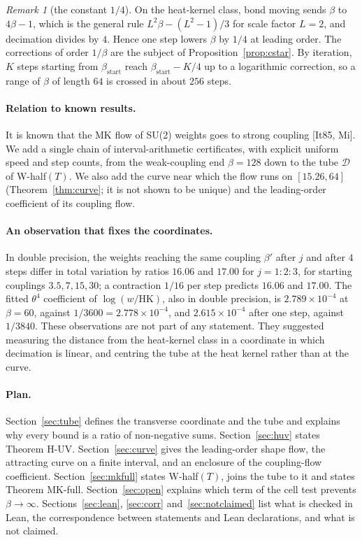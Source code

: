 \documentclass[11pt,a4paper]{article}
\theoremstyle{definition}
\theoremstyle{remark}
\newtheorem{remark}[theorem]{Remark}
\newcommand{\HK}{\mathrm{HK}}
\newcommand{\cD}{\mathcal{D}}
\begin{document}
\begin{remark}[the constant $1/4$]
On the heat-kernel class, bond moving sends $\beta$ to $4\beta-1$, which is the general rule $L^2\beta-(L^2-1)/3$ for scale factor $L=2$, and decimation divides by $4$.
Hence one step lowers $\beta$ by $1/4$ at leading order.
The corrections of order $1/\beta$ are the subject of Proposition~\ref{prop:cstar}.
By iteration, $K$ steps starting from $\beta_{\mathrm{start}}$ reach $\beta_{\mathrm{start}}-K/4$ up to a logarithmic correction, so a range of $\beta$ of length $64$ is crossed in about $256$ steps.
\end{remark}

\paragraph{Relation to known results.}
It is known that the MK flow of SU(2) weights goes to strong coupling [It85, Mi].
We add a single chain of interval-arithmetic certificates, with explicit uniform speed and step counts, from the weak-coupling end $\beta=128$ down to the tube $\cD$ of W-half$(T)$.
We also add the curve near which the flow runs on $[15.26,64]$ (Theorem~\ref{thm:curve}; it is not shown to be unique) and the leading-order coefficient of its coupling flow.

\paragraph{An observation that fixes the coordinates.}
In double precision, the weights reaching the same coupling $\beta'$ after $j$ and after $4$ steps differ in total variation by ratios $16.06$ and $17.00$ for $j=1{:}2{:}3$, for starting couplings $3.5,7,15,30$; a contraction $1/16$ per step predicts $16.06$ and $17.00$.
The fitted $\theta^4$ coefficient of $\log(w/\HK)$, also in double precision, is $2.789\times10^{-4}$ at $\beta=60$, against $1/3600=2.778\times10^{-4}$, and $2.615\times10^{-4}$ after one step, against $1/3840$.
These observations are not part of any statement.
They suggested measuring the distance from the heat-kernel class in a coordinate in which decimation is linear, and centring the tube at the heat kernel rather than at the curve.

\paragraph{Plan.}
Section~\ref{sec:tube} defines the transverse coordinate and the tube and explains why every bound is a ratio of non-negative sums.
Section~\ref{sec:huv} states Theorem H-UV.
Section~\ref{sec:curve} gives the leading-order shape flow, the attracting curve on a finite interval, and an enclosure of the coupling-flow coefficient.
Section~\ref{sec:mkfull} states W-half$(T)$, joins the tube to it and states Theorem MK-full.
Section~\ref{sec:open} explains which term of the cell test prevents $\beta\to\infty$.
Sections~\ref{sec:lean}, \ref{sec:corr} and~\ref{sec:notclaimed} list what is checked in Lean, the correspondence between statements and Lean declarations, and what is not claimed.
\end{document}
